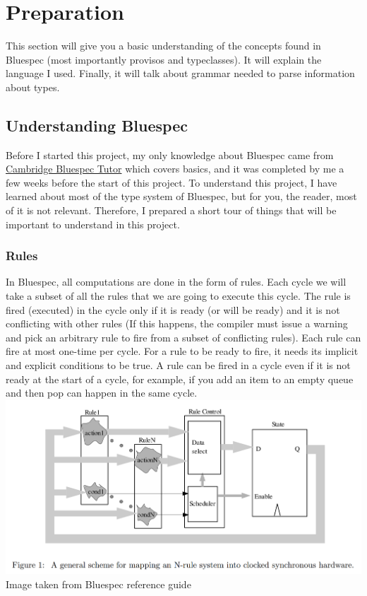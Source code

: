 \documentclass[12pt]{report}
\begin{document}
\chapter{Preparation}
This section will give you a basic understanding of the concepts found in Bluespec (most importantly provisos and typeclasses). It will explain the language I used. Finally, it will talk about grammar needed to parse information about types.
\section{Understanding Bluespec}
Before I started this project, my only knowledge about Bluespec came from \href{https://www-bluespec.cl.cam.ac.uk/}{Cambridge Bluespec Tutor} which covers basics, and it was completed by me a few weeks before the start of this project. To understand this project, I have learned about most of the type system of Bluespec, but for you, the reader, most of it is not relevant. Therefore, I prepared a short tour of things that will be important to understand in this project. 
\subsection{Rules}
In Bluespec, all computations are done in the form of rules.  
Each cycle we will take a subset of all the rules that we are going to execute this cycle. The rule is fired (executed) in the cycle only if it is ready (or will be ready) and it is not conflicting with other rules (If this happens, the compiler must issue a warning and pick an arbitrary rule to fire from a subset of conflicting rules). Each rule can fire at most one-time per cycle.  
For a rule to be ready to fire, it needs its implicit and explicit conditions to be true.  
A rule can be fired in a cycle even if it is not ready at the start of a cycle, for example, if you add an item to an empty queue and then pop can happen in the same cycle. \\ 
\includegraphics[width=\textwidth]{Rulemapping.png} 
Image taken from Bluespec reference guide \cite{BscReference} 
\end{document}
